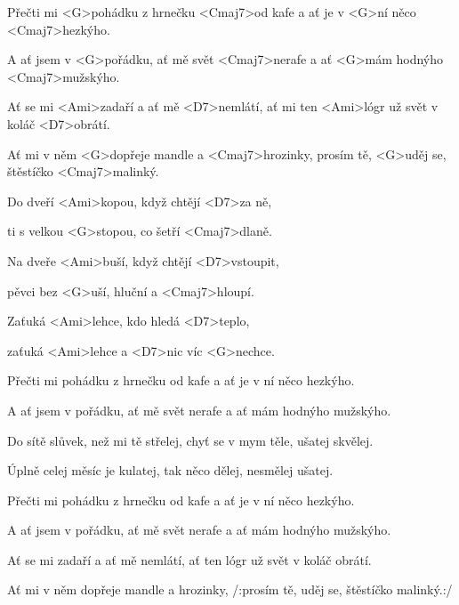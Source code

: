 

\zs
Přečti mi <G>pohádku z hrnečku <Cmaj7>od kafe
a ať je v <G>ní něco <Cmaj7>hezkýho.

A ať jsem v <G>pořádku, ať mě svět <Cmaj7>nerafe
a ať <G>mám hodnýho <Cmaj7>mužskýho.

Ať se mi <Ami>zadaří a ať mě <D7>nemlátí,
ať mi ten <Ami>lógr už svět v koláč <D7>obrátí.

Ať mi v něm <G>dopřeje mandle a <Cmaj7>hrozinky,
prosím tě, <G>uděj se, štěstíčko <Cmaj7>malinký.
\ks

\zr
Do dveří <Ami>kopou, když chtějí <D7>za ně,

ti s velkou <G>stopou, co šetří <Cmaj7>dlaně.

Na dveře <Ami>buší, když chtějí <D7>vstoupit,

pěvci bez <G>uší, hluční a <Cmaj7>hloupí.

Zaťuká <Ami>lehce, kdo hledá <D7>teplo,

zaťuká <Ami>lehce a <D7>nic víc <G>nechce.
\kr

\zs
Přečti mi pohádku z hrnečku od kafe
a ať je v ní něco hezkýho.

A ať jsem v pořádku, ať mě svět nerafe
a ať mám hodnýho mužskýho.

Do sítě slůvek, než mi tě střelej,
chyť se v mym těle, ušatej skvělej.

Úplně celej měsíc je kulatej,
tak něco dělej, nesmělej ušatej.
\ks

\zr \kr

\zs
Přečti mi pohádku z hrnečku od kafe
a ať je v ní něco hezkýho.

A ať jsem v pořádku, ať mě svět nerafe
a ať mám hodnýho mužskýho.

Ať se mi zadaří a ať mě nemlátí,
ať ten lógr už svět v koláč obrátí.

Ať mi v něm dopřeje mandle a hrozinky,
/:prosím tě, uděj se, štěstíčko malinký.:/
\ks

\kp
